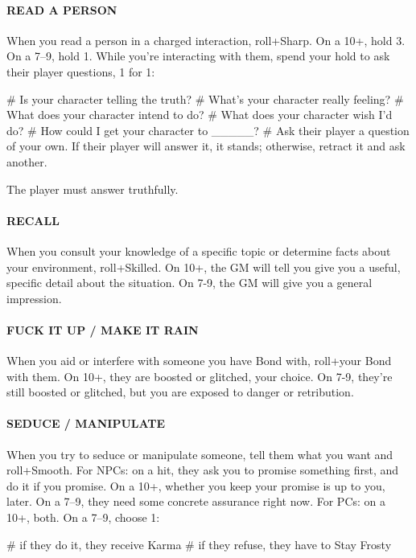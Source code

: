 \paragraph{READ A PERSON}
When you read a person in a charged interaction, roll+Sharp. On a 10+, hold 3. On a 7–9, hold 1. While you’re interacting with them, spend your hold to ask their player questions, 1 for 1:

\begin{easylist}
    # Is your character telling the truth?
    # What’s your character really feeling?
    # What does your character intend to do?
    # What does your character wish I’d do?
    # How could I get your character to \_\_\_\_\_?
    # Ask their player a question of your own. If their player will answer it, it stands; otherwise, retract it and ask another.
\end{easylist}

The player must answer truthfully.


\paragraph{RECALL}
When you consult your knowledge of a specific topic or determine facts about your environment, roll+Skilled. On 10+, the GM will tell you give you a useful, specific detail about the situation. On 7-9, the GM will give you a general impression.

\paragraph{FUCK IT UP / MAKE IT RAIN}
When you aid or interfere with someone you have Bond with, roll+your Bond with them. On 10+, they are boosted or glitched, your choice. On 7-9, they’re still boosted or glitched, but you are exposed to danger or retribution.

\paragraph{SEDUCE / MANIPULATE}
When you try to seduce or manipulate someone, tell them what you want and roll+Smooth.
For NPCs: on a hit, they ask you to promise something first, and do it if you promise. On a 10+, whether you keep your promise is up to you, later. On a 7–9, they need some concrete assurance right now.
For PCs: on a 10+, both. On a 7–9, choose 1:

\begin{easylist}
    # if they do it, they receive Karma
    # if they refuse, they have to Stay Frosty 
\end{easylist}

